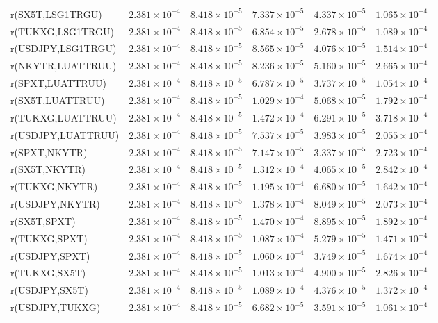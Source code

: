\documentclass[10pt,a4paper]{article}
\begin{document}
\begin{tabular*}{\linewidth}{@{\extracolsep{\fill}}lrrrrr@{}}
r(SX5T,LSG1TRGU) & $2.381\times10^{-4}$ & $8.418\times10^{-5}$ & $7.337\times10^{-5}$ & $4.337\times10^{-5}$ & $1.065\times10^{-4}$ \\
r(TUKXG,LSG1TRGU) & $2.381\times10^{-4}$ & $8.418\times10^{-5}$ & $6.854\times10^{-5}$ & $2.678\times10^{-5}$ & $1.089\times10^{-4}$ \\
r(USDJPY,LSG1TRGU) & $2.381\times10^{-4}$ & $8.418\times10^{-5}$ & $8.565\times10^{-5}$ & $4.076\times10^{-5}$ & $1.514\times10^{-4}$ \\
r(NKYTR,LUATTRUU) & $2.381\times10^{-4}$ & $8.418\times10^{-5}$ & $8.236\times10^{-5}$ & $5.160\times10^{-5}$ & $2.665\times10^{-4}$ \\
r(SPXT,LUATTRUU) & $2.381\times10^{-4}$ & $8.418\times10^{-5}$ & $6.787\times10^{-5}$ & $3.737\times10^{-5}$ & $1.054\times10^{-4}$ \\
r(SX5T,LUATTRUU) & $2.381\times10^{-4}$ & $8.418\times10^{-5}$ & $1.029\times10^{-4}$ & $5.068\times10^{-5}$ & $1.792\times10^{-4}$ \\
r(TUKXG,LUATTRUU) & $2.381\times10^{-4}$ & $8.418\times10^{-5}$ & $1.472\times10^{-4}$ & $6.291\times10^{-5}$ & $3.718\times10^{-4}$ \\
r(USDJPY,LUATTRUU) & $2.381\times10^{-4}$ & $8.418\times10^{-5}$ & $7.537\times10^{-5}$ & $3.983\times10^{-5}$ & $2.055\times10^{-4}$ \\
r(SPXT,NKYTR) & $2.381\times10^{-4}$ & $8.418\times10^{-5}$ & $7.147\times10^{-5}$ & $3.337\times10^{-5}$ & $2.723\times10^{-4}$ \\
r(SX5T,NKYTR) & $2.381\times10^{-4}$ & $8.418\times10^{-5}$ & $1.312\times10^{-4}$ & $4.065\times10^{-5}$ & $2.842\times10^{-4}$ \\
r(TUKXG,NKYTR) & $2.381\times10^{-4}$ & $8.418\times10^{-5}$ & $1.195\times10^{-4}$ & $6.680\times10^{-5}$ & $1.642\times10^{-4}$ \\
r(USDJPY,NKYTR) & $2.381\times10^{-4}$ & $8.418\times10^{-5}$ & $1.378\times10^{-4}$ & $8.049\times10^{-5}$ & $2.073\times10^{-4}$ \\
r(SX5T,SPXT) & $2.381\times10^{-4}$ & $8.418\times10^{-5}$ & $1.470\times10^{-4}$ & $8.895\times10^{-5}$ & $1.892\times10^{-4}$ \\
r(TUKXG,SPXT) & $2.381\times10^{-4}$ & $8.418\times10^{-5}$ & $1.087\times10^{-4}$ & $5.279\times10^{-5}$ & $1.471\times10^{-4}$ \\
r(USDJPY,SPXT) & $2.381\times10^{-4}$ & $8.418\times10^{-5}$ & $1.060\times10^{-4}$ & $3.749\times10^{-5}$ & $1.674\times10^{-4}$ \\
r(TUKXG,SX5T) & $2.381\times10^{-4}$ & $8.418\times10^{-5}$ & $1.013\times10^{-4}$ & $4.900\times10^{-5}$ & $2.826\times10^{-4}$ \\
r(USDJPY,SX5T) & $2.381\times10^{-4}$ & $8.418\times10^{-5}$ & $1.089\times10^{-4}$ & $4.376\times10^{-5}$ & $1.372\times10^{-4}$ \\
r(USDJPY,TUKXG) & $2.381\times10^{-4}$ & $8.418\times10^{-5}$ & $6.682\times10^{-5}$ & $3.591\times10^{-5}$ & $1.061\times10^{-4}$ \\
\bottomrule
\end{tabular*}\endgroup
\end{document}
